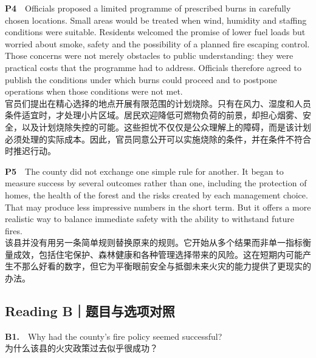 \documentclass[a4paper,11pt,openany]{report}
\newcommand{\zhline}[1]{{\CJKsf\color{bodygrey}#1}}
\begin{document}
\begin{samepage}
\textbf{P4}　Officials proposed a limited programme of prescribed burns in carefully chosen locations. Small areas would be treated when wind, humidity and staffing conditions were suitable. Residents welcomed the promise of lower fuel loads but worried about smoke, safety and the possibility of a planned fire escaping control. Those concerns were not merely obstacles to public understanding: they were practical costs that the programme had to address. Officials therefore agreed to publish the conditions under which burns could proceed and to postpone operations when those conditions were not met.\\
\zhline{官员们提出在精心选择的地点开展有限范围的计划烧除。只有在风力、湿度和人员条件适宜时，才处理小片区域。居民欢迎降低可燃物负荷的前景，却担心烟雾、安全，以及计划烧除失控的可能。这些担忧不仅仅是公众理解上的障碍，而是该计划必须处理的实际成本。因此，官员同意公开可以实施烧除的条件，并在条件不符合时推迟行动。}
\par\end{samepage}

\begin{samepage}
\textbf{P5}　The county did not exchange one simple rule for another. It began to measure success by several outcomes rather than one, including the protection of homes, the health of the forest and the risks created by each management choice. That may produce less impressive numbers in the short term. But it offers a more realistic way to balance immediate safety with the ability to withstand future fires.\\
\zhline{该县并没有用另一条简单规则替换原来的规则。它开始从多个结果而非单一指标衡量成效，包括住宅保护、森林健康和各种管理选择带来的风险。这在短期内可能产生不那么好看的数字，但它为平衡眼前安全与抵御未来火灾的能力提供了更现实的办法。}
\par\end{samepage}

\subsection{Reading B｜题目与选项对照}\label{reading-bux9898ux76eeux4e0eux9009ux9879ux5bf9ux7167}

\begin{samepage}
\textbf{B1.}　Why had the county's fire policy seemed successful?\\
\zhline{为什么该县的火灾政策过去似乎很成功？}
\par\end{samepage}
\end{document}
